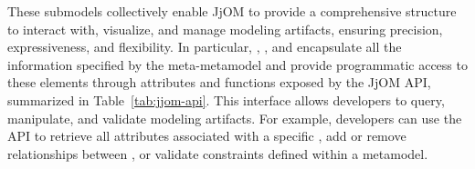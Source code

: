 These submodels collectively enable JjOM to provide a comprehensive structure to interact with, visualize, and manage modeling artifacts, ensuring precision, expressiveness, and flexibility. In particular, , , and  encapsulate all the information specified by the meta-metamodel and provide programmatic access to these elements through attributes and functions exposed by the JjOM API, summarized in Table~\ref{tab:jjom-api}. This interface allows developers to query, manipulate, and validate modeling artifacts. For example, developers can use the API to retrieve all attributes associated with a specific , add or remove relationships between , or validate constraints defined within a metamodel. 
%
%
%
%
